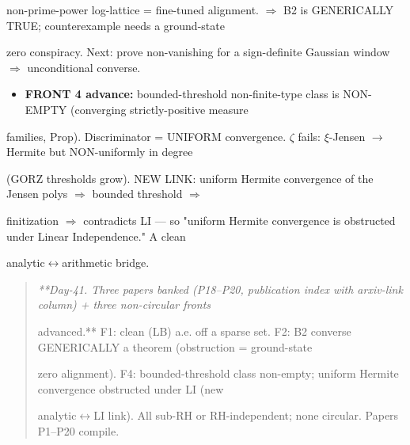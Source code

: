 \documentclass[10pt]{article}
\begin{document}
  non-prime-power log-lattice = fine-tuned alignment. \ensuremath{\Rightarrow} B2 is GENERICALLY TRUE; counterexample needs a ground-state\par
  zero conspiracy. Next: prove non-vanishing for a sign-definite Gaussian window \ensuremath{\Rightarrow} unconditional converse.\par
\begin{itemize}
\item \textbf{FRONT 4 advance:} bounded-threshold non-finite-type class is NON-EMPTY (converging strictly-positive measure
\end{itemize}
  families, Prop). Discriminator = UNIFORM convergence. \ensuremath{\zeta} fails: \ensuremath{\xi}-Jensen \ensuremath{\to} Hermite but NON-uniformly in degree\par
  (GORZ thresholds grow). NEW LINK: uniform Hermite convergence of the Jensen polys \ensuremath{\Rightarrow} bounded threshold \ensuremath{\Rightarrow}\par
  finitization \ensuremath{\Rightarrow} contradicts LI --- so "uniform Hermite convergence is obstructed under Linear Independence." A clean\par
  analytic\ensuremath{\leftrightarrow}arithmetic bridge.\par

\begin{quote}\itshape
**Day-41. Three papers banked (P18--P20, publication index with arxiv-link column) + three non-circular fronts\par
advanced.** F1: clean (LB) a.e. off a sparse set. F2: B2 converse GENERICALLY a theorem (obstruction = ground-state\par
zero alignment). F4: bounded-threshold class non-empty; uniform Hermite convergence obstructed under LI (new\par
analytic\ensuremath{\leftrightarrow}LI link). All sub-RH or RH-independent; none circular. Papers P1--P20 compile.\par
\end{quote}
\end{document}
